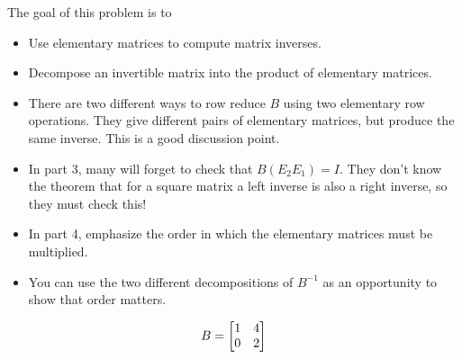 	\bookonlynewpage
	\question
	\begin{annotation}
		\begin{goals}

			The goal of this problem is to
			\begin{itemize}
				\item Use elementary matrices to compute matrix inverses.
				\item Decompose an invertible matrix into the product of elementary matrices.
			\end{itemize}
		\end{goals}

		\begin{notes}
			\begin{itemize}
				\item There are two different ways to row reduce $B$ using two elementary row
					operations. They give different pairs of elementary matrices, but produce
					the same inverse. This is a good discussion point.
				\item In part 3, many will forget to check that $B(E_2E_1)=I$. They don't know
					the theorem that for a square matrix a left inverse is also a right inverse,
					so they must check this!
				\item In part 4, emphasize the order in which the elementary matrices must be multiplied.
				\item You can use the two different decompositions of $B^{-1}$ as an opportunity to
					show that order matters.
			\end{itemize}
		\end{notes}
	\end{annotation}
	\[
		B=\mat{1 &4\\0 &2}
	\]
